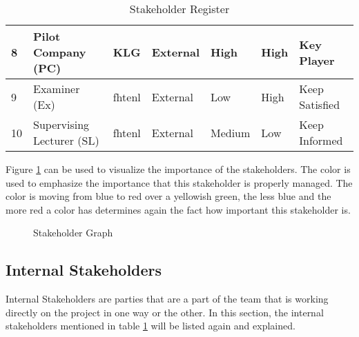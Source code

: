 \begin{table}[htbp]
{\begin{tabular}{|p{}|p{}|p{}|p{}|p{}|p{}|p{}|}
8  & Pilot Company (PC)       & KLG                   & External            & High              & High               & Key Player                \\ \hline
9  & Examiner (Ex)            & \gls{fhtenl}        & External            & Low               & High               & Keep Satisfied            \\ \hline
10  & Supervising Lecturer (SL) & \gls{fhtenl}        & External            & Medium            & Low                & Keep Informed             \\ \hline
\end{tabular}
}
\caption{Stakeholder Register}
\label{tab:stakeholder}
\end{table}

Figure \ref{fig:stakeholder} can be used to visualize the importance of the stakeholders. The color is used to emphasize the importance that this stakeholder is properly managed. The color is moving from blue to red over a yellowish green, the less blue and the more red a color has determines again the fact how important this stakeholder is.

\begin{figure}[htbp]
	\centering
	\caption{Stakeholder Graph}
	\label{fig:stakeholder}
\end{figure}
\subsection{Internal Stakeholders}\label{ssec:internalStakeholders}
Internal Stakeholders are parties that are a part of the team that is working directly on the project in one way or the other. In this section, the internal stakeholders mentioned in table \ref{tab:stakeholder} will be listed again and explained.

